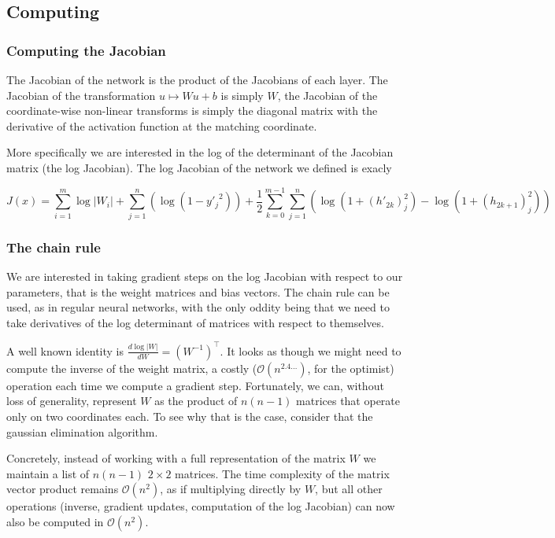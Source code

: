 \documentclass{article}
\begin{document}
\subsection{Computing}

\subsubsection{Computing the Jacobian}
The Jacobian  of the network is the product of the Jacobians of each
layer. The Jacobian of the transformation \( u \mapsto W u + b \) is simply
\( W \), the Jacobian of the coordinate-wise non-linear transforms is simply
the diagonal matrix with the derivative of the activation function at the
matching coordinate.

More specifically we are interested in the log of the determinant of the
Jacobian matrix (the log Jacobian). The log Jacobian of the network we defined
is exacly

\[
  J(x) = \sum_{i=1}^{m} \log |W_{i}| +
  \sum_{j=1}^n \left(\log(1-{y'_j}^2)\right)
  + \frac{1}{2} \sum_{k=0}^{m-1} \sum_{j=1}^n
  \left( \log (1 + (h'_{2k})_j^2) - \log (1 + (h_{2k+1})_j^2) \right)
\]

\subsubsection{The chain rule}
We are interested in taking gradient steps on the log Jacobian with respect to
our parameters, that is the weight matrices and bias vectors. The chain rule
can be used, as in regular neural networks, with the only oddity being that we
need to take derivatives of the log determinant of matrices with respect to
themselves.

A well known identity is \(\frac{d \log |W|}{d W} = (W^{-1})^\top\). It looks as
though we might need to compute the inverse of the weight matrix, a costly
(\(\mathcal{O}(n^{2.4\ldots})\), for the optimist) operation each time we
compute a gradient step. Fortunately, we can, without loss of generality,
represent \(W\) as the product of \(n(n-1)\) matrices that operate only on two
coordinates each. To see why that is the case, consider that the gaussian
elimination algorithm.

Concretely, instead of working with a full representation of the matrix \(W\) we
maintain a list of \(n(n-1)\) \(2 \times 2\) matrices. The time complexity of
the matrix vector product remains \(\mathcal{O}(n^2)\), as if multiplying
directly by \(W\), but all other operations (inverse, gradient updates,
computation of the log Jacobian) can now also be computed in
\(\mathcal{O}(n^2)\).
\end{document}
